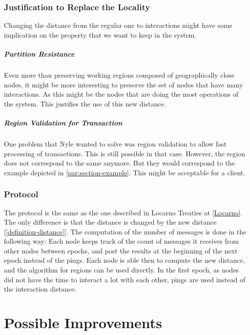 \documentclass[a4paper,11pt,oneside]{report}
\begin{document}
\subsection{Justification to Replace the Locality}
Changing the distance from the regular one to interactions might have some
implication on the property that we want to keep in the system. 

\paragraph{Partition Resistance}
Even more than preserving working regions
composed of geographically close nodes, it might be more interesting to preserve
the set of nodes that have many interactions. As this might be the nodes
that are doing the most operations of the system. This justifies the use of
this new distance.

\paragraph{Region Validation for Transaction}
One problem that Nyle wanted to solve was region validation to allow fast
processing of transactions. This is still possible in that case. However, the
region does not correspond to the same anymore. But they would correspond to
the example depicted in \autoref{par:section-example}. This might be acceptable
for a client. 

\subsection{Protocol}
The protocol is the same as the one described in Locarno Treaties at
\autoref{Locarno}. The only difference is that the distance is changed by the
new distance [\autoref{definition-distance}]. The computation of the number of
messages is done in the following way: Each node keeps track of the count
of messages it receives from other nodes between epochs, and post the results
at the beginning of the next epoch instead of the pings. Each node is able then
to compute the new distance, and the algorithm for regions can be used
directly. In the first epoch, as nodes did not have the time to interact a lot
with each other, pings are used instead of the interaction distance.


\chapter{Possible Improvements} \label{chap:Possible Improvements} %
\end{document}
